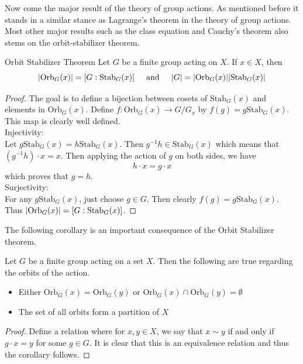 \documentclass[a4paper]{article}
\begin{document}
Now come the major result of the theory of group actions. As mentioned before it stands in a similar stance as Lagrange's theorem in the theory of group actions. Most other major results such as the class equation and Cauchy's theorem also stems on the orbit-stabilizer theorem. 

\begin{thm}{Orbit Stabilizer Theorem}{} Let $G$ be a finite group acting on $X$. If $x\in X$, then $$\abs{\text{Orb}_G(x)}=[G:\text{Stab}_G(x)]\;\;\;\;\text{ and }\;\;\;\;\abs{G}=\abs{\text{Orb}_G(x)}\abs{\text{Stab}_G(x)}$$ 
\begin{proof}
The goal is to define a bijection between cosets of $\text{Stab}_G(x)$ and elements in $\text{Orb}_G(x)$. Define $f:\text{Orb}_G(x)\to G/G_x$ by $f(g)=g\text{Stab}_G(x)$. This map is clearly well defined. \\
Injectivity: \\
Let $g\text{Stab}_G(x)=h\text{Stab}_G(x)$. Then $g^{-1}h\in\text{Stab}_G(x)$ which means that $(g^{-1}h)\cdot x=x$. Then applying the action of $g$ on both sides, we have $$h\cdot x=g\cdot x$$ which proves that $g=h$. \\
Surjectivity: \\
For any $g\text{Stab}_G(x)$, just choose $g\in G$. Then clearly $f(g)=g\text{Stab}_G(x)$. \\
Thus $\abs{\text{Orb}_G(x)}=[G:\text{Stab}_G(x)]$. 
\end{proof}
\end{thm}

The following corollary is an important consequence of the Orbit Stabilizer theorem. 

\begin{crl}{}{} Let $G$ be a finite group acting on a set $X$. Then the following are true regarding the orbits of the action. 
\begin{itemize}
\item Either $\text{Orb}_G(x)=\text{Orb}_G(y)$ or $\text{Orb}_G(x)\cap\text{Orb}_G(y)=\emptyset$
\item The set of all orbits form a partition of $X$
\end{itemize}
\begin{proof}
Define a relation where for $x,y\in X$, we say that $x\sim y$ if and only if $g\cdot x=y$ for some $g\in G$. It is clear that this is an equivalence relation and thus the corollary follows. 
\end{proof}
\end{crl}
\end{document}
